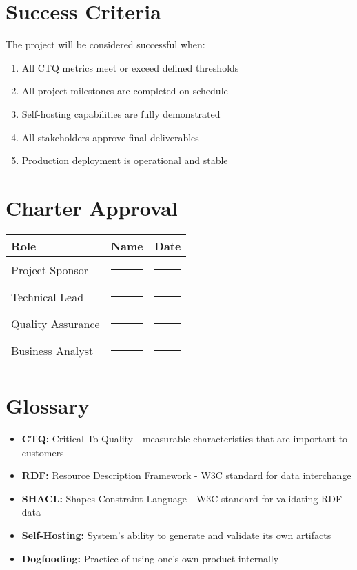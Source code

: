\documentclass[11pt,a4paper]{article}
\begin{document}
{{{{{{{{%
\section{Success Criteria}

The project will be considered successful when:
\begin{enumerate}[leftmargin=2cm]
    \item All CTQ metrics meet or exceed defined thresholds
    \item All project milestones are completed on schedule
    \item Self-hosting capabilities are fully demonstrated
    \item All stakeholders approve final deliverables
    \item Production deployment is operational and stable
\end{enumerate}

\section{Charter Approval}

\begin{center}
\begin{tabular}{|p{4cm}|p{4cm}|p{4cm}|}
\hline
\textbf{Role} & \textbf{Name} & \textbf{Date} \\
\hline
Project Sponsor & \rule{3cm}{0.4pt} & \rule{3cm}{0.4pt} \\
\hline
Technical Lead & \rule{3cm}{0.4pt} & \rule{3cm}{0.4pt} \\
\hline
Quality Assurance & \rule{3cm}{0.4pt} & \rule{3cm}{0.4pt} \\
\hline
Business Analyst & \rule{3cm}{0.4pt} & \rule{3cm}{0.4pt} \\
\hline
\end{tabular}
\end{center}

\appendix

\section{Glossary}
\begin{itemize}[leftmargin=2cm]
    \item \textbf{CTQ:} Critical To Quality - measurable characteristics that are important to customers
    \item \textbf{RDF:} Resource Description Framework - W3C standard for data interchange
    \item \textbf{SHACL:} Shapes Constraint Language - W3C standard for validating RDF data
    \item \textbf{Self-Hosting:} System's ability to generate and validate its own artifacts
    \item \textbf{Dogfooding:} Practice of using one's own product internally
\end{itemize}

}}}}}}}}
\end{document}
